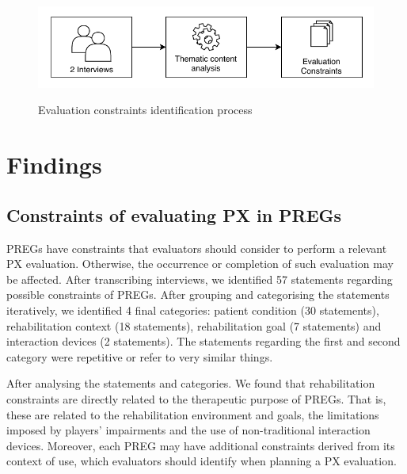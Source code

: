 \begin{figure}[htb]
\myfloatalign
{\includegraphics[width=\linewidth]{gfx/characterisation/constraintsIdentification}} \quad
\caption{Evaluation constraints identification process}\label{fig:constraintsIdentification}
\end{figure}

\section{Findings} %
\label{sec:findings_char}
\subsection{Constraints of evaluating PX in \acp{PREG}} %
\label{sec:constraints}

\acp{PREG} have constraints that evaluators should consider to perform a relevant PX evaluation. Otherwise, the occurrence or completion of such evaluation may be affected. After transcribing interviews, we identified 57 statements regarding possible constraints of \acp{PREG}. After grouping and categorising the statements iteratively, we identified 4 final categories: patient condition (30 statements), rehabilitation context (18 statements), rehabilitation goal (7 statements) and interaction devices (2 statements). The statements regarding the first and second category were repetitive or refer to very similar things.

After analysing the statements and categories. We found that rehabilitation constraints are directly related to the therapeutic purpose of \acp{PREG}. That is, these are related to the rehabilitation environment and goals, the limitations imposed by players' impairments and the use of non-traditional interaction devices. Moreover, each \ac{PREG} may have additional constraints derived from its context of use, which evaluators should identify when planning a \ac{PX} evaluation.

